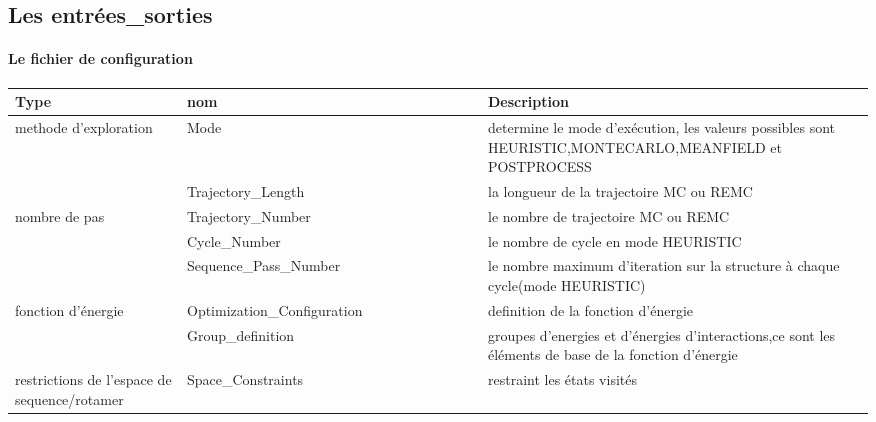    

\subsection{Les entrées\_sorties} 


\paragraph{Le fichier de configuration}




    \begin{table}[!htbp]
      \centering


      \begin{tabular}{|p{0.2\linewidth}|p{0.35\linewidth}|p{0.45\linewidth}|}

        \hline
        Type   & nom & Description \\
        \hline
          methode  d'exploration & Mode &  determine  le mode d'exécution, les valeurs possibles sont HEURISTIC,MONTECARLO,MEANFIELD et POSTPROCESS  \\  \hline    
                        & Trajectory\_Length  &  la longueur de la trajectoire MC ou REMC\\  \cline{2-3}
        nombre de pas & Trajectory\_Number  &  le nombre de trajectoire  MC ou REMC  \\  \cline{2-3}
                        & Cycle\_Number  &    le nombre de cycle en mode HEURISTIC   \\ \cline{2-3}  
                        & Sequence\_Pass\_Number  &  le nombre maximum d'iteration sur  la structure à chaque cycle(mode HEURISTIC)    \\ \hline  

        fonction d'énergie &  Optimization\_Configuration &   definition de la fonction d'énergie\\               \cline{2-3}
                        &  Group\_definition &   groupes  d'energies et d'énergies d'interactions,ce sont les éléments de base de la fonction d'énergie\\  \hline  
        restrictions de l'espace de  sequence/rotamer & Space\_Constraints   &  restraint les états visités \\ \hline                
                         

\end{tabular}
\end{table}
